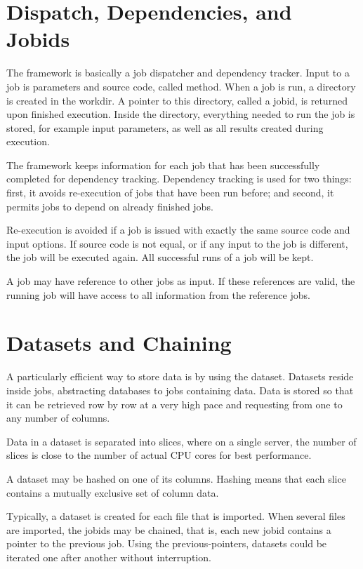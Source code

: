 \section{Dispatch, Dependencies, and Jobids}

The framework is basically a job dispatcher and dependency tracker.
Input to a job is parameters and source code, called method.  When a
job is run, a directory is created in the workdir.  A pointer to this
directory, called a jobid, is returned upon finished execution.
Inside the directory, everything needed to run the job is stored, for
example input parameters, as well as all results created during
execution.

The framework keeps information for each job that has been
successfully completed for dependency tracking.  Dependency tracking
is used for two things: first, it avoids re-execution of jobs that
have been run before; and second, it permits jobs to depend on already
finished jobs.

Re-execution is avoided if a job is issued with exactly the same
source code and input options.  If source code is not equal, or if any
input to the job is different, the job will be executed again.  All
successful runs of a job will be kept.

A job may have reference to other jobs as input.  If these references
are valid, the running job will have access to all information from
the reference jobs.



\section{Datasets and Chaining}

A particularly efficient way to store data is by using the dataset.
Datasets reside inside jobs, abstracting databases to jobs containing
data.  Data is stored so that it can be retrieved row by row at a very
high pace and requesting from one to any number of columns.

Data in a dataset is separated into slices, where on a single server,
the number of slices is close to the number of actual CPU cores for
best performance.

A dataset may be hashed on one of its columns.  Hashing means that
each slice contains a mutually exclusive set of column data.

Typically, a dataset is created for each file that is imported.  When
several files are imported, the jobids may be chained, that is, each
new jobid contains a pointer to the previous job.  Using the
previous-pointers, datasets could be iterated one after another
without interruption.



